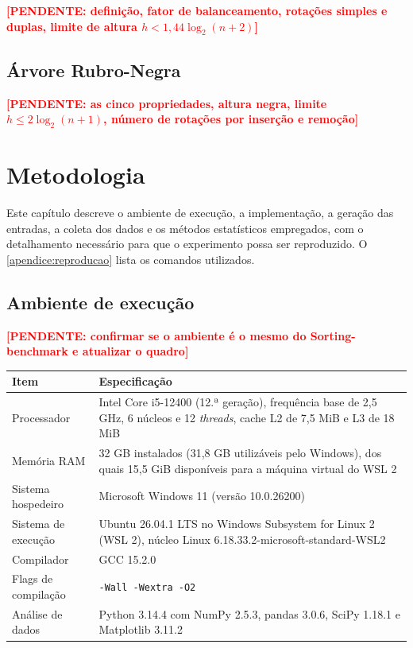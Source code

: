 \documentclass[
    12pt,
    oneside,
    a4paper,
    openany,
    chapter=TITLE,
    english,
    brazil
]{abntex2}
\newcommand{\pendente}[1]{\textcolor{red}{\textbf{[PENDENTE: #1]}}}
\begin{document}
\pendente{definição, fator de balanceamento, rotações simples e duplas, limite de altura $h < 1{,}44 \log_2(n + 2)$}

\section{Árvore Rubro-Negra}
\label{sec:rb}

\pendente{as cinco propriedades, altura negra, limite $h \le 2 \log_2(n + 1)$, número de rotações por inserção e remoção}

\chapter{Metodologia}
\label{cap:metodologia}

Este capítulo descreve o ambiente de execução, a implementação, a geração das entradas, a coleta dos dados e os métodos estatísticos empregados, com o detalhamento necessário para que o experimento possa ser reproduzido. O \autoref{apendice:reproducao} lista os comandos utilizados.

\section{Ambiente de execução}

\pendente{confirmar se o ambiente é o mesmo do Sorting-benchmark e atualizar o quadro}

\begin{quadro}[htbp]
    \caption{Especificações do ambiente de execução}
    \label{quadro:ambiente}
    \centering
    \small
    \begin{tabular}{|l|p{9.5cm}|}
        \hline
        \textbf{Item} & \textbf{Especificação} \\ \hline
        Processador & Intel Core i5-12400 (12.ª geração), frequência base de 2,5 GHz, 6 núcleos e 12 \textit{threads}, cache L2 de 7,5 MiB e L3 de 18 MiB \\ \hline
        Memória RAM & 32 GB instalados (31,8 GB utilizáveis pelo Windows), dos quais 15,5 GiB disponíveis para a máquina virtual do WSL 2 \\ \hline
        Sistema hospedeiro & Microsoft Windows 11 (versão 10.0.26200) \\ \hline
        Sistema de execução & Ubuntu 26.04.1 LTS no Windows Subsystem for Linux 2 (WSL 2), núcleo Linux 6.18.33.2-microsoft-standard-WSL2 \\ \hline
        Compilador & GCC 15.2.0 \\ \hline
        Flags de compilação & \texttt{-Wall -Wextra -O2} \\ \hline
        Análise de dados & Python 3.14.4 com NumPy 2.5.3, pandas 3.0.6, SciPy 1.18.1 e Matplotlib 3.11.2 \\ \hline
    \end{tabular}
\end{quadro}
\end{document}
